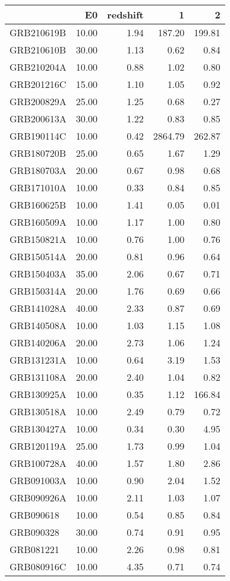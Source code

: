 \begin{tabular}{lrrrr}
\toprule
 & E0 & redshift & 1 & 2 \\
\midrule
GRB210619B & 10.00 & 1.94 & 187.20 & 199.81 \\
GRB210610B & 30.00 & 1.13 & 0.62 & 0.84 \\
GRB210204A & 10.00 & 0.88 & 1.02 & 0.80 \\
GRB201216C & 15.00 & 1.10 & 1.05 & 0.92 \\
GRB200829A & 25.00 & 1.25 & 0.68 & 0.27 \\
GRB200613A & 30.00 & 1.22 & 0.83 & 0.85 \\
GRB190114C & 10.00 & 0.42 & 2864.79 & 262.87 \\
GRB180720B & 25.00 & 0.65 & 1.67 & 1.29 \\
GRB180703A & 20.00 & 0.67 & 0.98 & 0.68 \\
GRB171010A & 10.00 & 0.33 & 0.84 & 0.85 \\
GRB160625B & 10.00 & 1.41 & 0.05 & 0.01 \\
GRB160509A & 10.00 & 1.17 & 1.00 & 0.80 \\
GRB150821A & 10.00 & 0.76 & 1.00 & 0.76 \\
GRB150514A & 20.00 & 0.81 & 0.96 & 0.64 \\
GRB150403A & 35.00 & 2.06 & 0.67 & 0.71 \\
GRB150314A & 20.00 & 1.76 & 0.69 & 0.66 \\
GRB141028A & 40.00 & 2.33 & 0.87 & 0.69 \\
GRB140508A & 10.00 & 1.03 & 1.15 & 1.08 \\
GRB140206A & 20.00 & 2.73 & 1.06 & 1.24 \\
GRB131231A & 10.00 & 0.64 & 3.19 & 1.53 \\
GRB131108A & 20.00 & 2.40 & 1.04 & 0.82 \\
GRB130925A & 10.00 & 0.35 & 1.12 & 166.84 \\
GRB130518A & 10.00 & 2.49 & 0.79 & 0.72 \\
GRB130427A & 10.00 & 0.34 & 0.30 & 4.95 \\
GRB120119A & 25.00 & 1.73 & 0.99 & 1.04 \\
GRB100728A & 40.00 & 1.57 & 1.80 & 2.86 \\
GRB091003A & 10.00 & 0.90 & 2.04 & 1.52 \\
GRB090926A & 10.00 & 2.11 & 1.03 & 1.07 \\
GRB090618 & 10.00 & 0.54 & 0.85 & 0.84 \\
GRB090328 & 30.00 & 0.74 & 0.91 & 0.95 \\
GRB081221 & 10.00 & 2.26 & 0.98 & 0.81 \\
GRB080916C & 10.00 & 4.35 & 0.71 & 0.74 \\
\bottomrule
\end{tabular}
